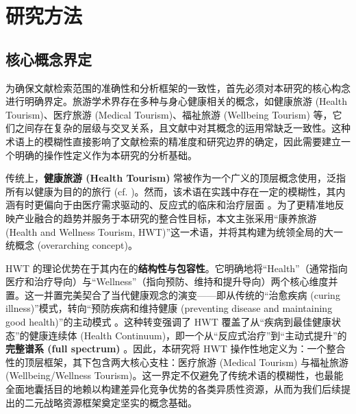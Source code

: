 \documentclass[UTF8, 12pt, a4paper, twoside]{ctexart}
\begin{document}

\section{研究方法}

\subsection{核心概念界定}

为确保文献检索范围的准确性和分析框架的一致性，首先必须对本研究的核心构念进行明确界定。旅游学术界存在多种与身心健康相关的概念，如健康旅游 (Health Tourism)、医疗旅游 (Medical Tourism)、福祉旅游 (Wellbeing Tourism) 等，它们之间存在复杂的层级与交叉关系，且文献中对其概念的运用常缺乏一致性。这种术语上的模糊性直接影响了文献检索的精准度和研究边界的确定，因此需要建立一个明确的操作性定义作为本研究的分析基础。

传统上，\textbf{健康旅游 (Health Tourism)} 常被作为一个广义的顶层概念使用，泛指所有以健康为目的的旅行 (cf. \textcite{zhong2021medical})。然而，该术语在实践中存在一定的模糊性，其内涵有时更偏向于由医疗需求驱动的、反应式的临床和治疗层面 \parencite{connell2006medical, smith2011medical}。为了更精准地反映产业融合的趋势并服务于本研究的整合性目标，本文主张采用“康养旅游 (Health and Wellness Tourism, HWT)”这一术语，并将其构建为统领全局的大一统概念 (overarching concept)。

HWT 的理论优势在于其内在的\textbf{结构性与包容性}。它明确地将“Health”（通常指向医疗和治疗导向）与“Wellness”（指向预防、维持和提升导向）两个核心维度并置。这一并置完美契合了当代健康观念的演变——即从传统的“治愈疾病 (curing illness)”模式，转向“预防疾病和维持健康 (preventing disease and maintaining good health)”的主动模式 \parencite{zhengHealingTourismInterdisciplinary2025a, goodarziWellnessTourismSareyn2016a, guerra2022new}。这种转变强调了 HWT 覆盖了从“疾病到最佳健康状态”的健康连续体 (Health Continuum)，即一个从“反应式治疗”到“主动式提升”的\textbf{完整谱系 (full spectrum)} \parencite{zhengHealingTourismInterdisciplinary2025a, peng2025wellness}。因此，本研究将 HWT 操作性地定义为：一个整合性的顶层框架，其下包含两大核心支柱：医疗旅游 (Medical Tourism) 与福祉旅游 (Wellbeing/Wellness Tourism)。这一界定不仅避免了传统术语的模糊性，也最能全面地囊括目的地赖以构建差异化竞争优势的各类异质性资源，从而为我们后续提出的二元战略资源框架奠定坚实的概念基础。
\end{document}

